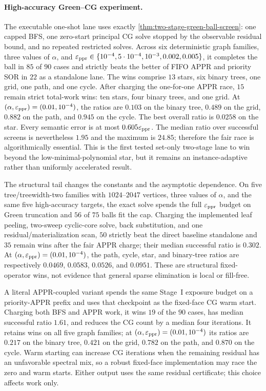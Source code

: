 \paragraph{High-accuracy Green--CG experiment.}
The executable one-shot lane uses exactly
\cref{thm:two-stage-green-ball-screen}: one capped BFS, one zero-start
principal CG solve stopped by the observable residual bound, and no repeated
restricted solves.  Across six deterministic graph families, three values of
$\alpha$, and
$\varepsilon_{\mathrm{ppr}}\in\{10^{-4},5\cdot10^{-4},10^{-3},0.002,0.005\}$, it completes the
ball in $85$ of $90$ cases and strictly beats the better of FIFO APPR and
priority SOR in $22$ as a standalone lane.  The wins comprise $13$ stars,
six binary trees, one grid, one path, and one cycle.  After charging the
one-for-one APPR race, $15$ remain strict total-work wins: ten stars, four
binary trees, and one grid.  At $(\alpha,\varepsilon_{\mathrm{ppr}})=(0.01,10^{-4})$, the
ratios are $0.103$ on the binary tree, $0.489$ on the grid, $0.882$ on the
path, and $0.945$ on the cycle.  The best overall ratio is $0.0258$ on the
star.  Every semantic error is at most $0.605\varepsilon_{\mathrm{ppr}}$.  The median ratio over
successful screens is nevertheless $1.95$ and the maximum is $24.85$;
therefore the fair race is algorithmically essential.  This is the first
tested set-only two-stage lane to win beyond the low-minimal-polynomial star,
but it remains an instance-adaptive rather than uniformly accelerated result.

The structural tail changes the constants and the asymptotic dependence.
On five tree/treewidth-two families with $1024$--$2047$ vertices, three values
of $\alpha$, and the same five high-accuracy targets, the exact solve spends
the full $\varepsilon_{\mathrm{ppr}}$ budget on Green truncation and $56$ of $75$ balls fit the
cap.  Charging the implemented leaf peeling, two-sweep cyclic-core solve,
back substitution, and one residual/materialization scan, $50$ strictly beat
the direct baseline standalone and $35$ remain wins after the fair APPR
charge; their median successful ratio is $0.302$.  At
$(\alpha,\varepsilon_{\mathrm{ppr}})=(0.01,10^{-4})$, the path, cycle,
star, and binary-tree ratios are respectively $0.0469$, $0.0583$, $0.0526$,
and $0.0951$.  These are structural fixed-operator wins, not evidence that
general sparse elimination is local or fill-free.

A literal APPR-coupled variant spends the same Stage~I exposure budget on a
priority-APPR prefix and uses that checkpoint as the fixed-face CG warm start.
Charging both BFS and APPR work, it wins $19$ of the $90$ cases, has median
successful ratio $1.61$, and reduces the CG count by a median four iterations.
It retains wins on all five graph families; at
$(\alpha,\varepsilon_{\mathrm{ppr}})=(0.01,10^{-4})$ its ratios are $0.217$ on the binary tree,
$0.421$ on the grid, $0.782$ on the path, and $0.870$ on the cycle.  Warm
starting can increase CG iterations when the remaining residual has an
unfavorable spectral mix, so a robust fixed-face implementation may race the
zero and warm starts.  Either output uses the same residual certificate; this
choice affects work only.

